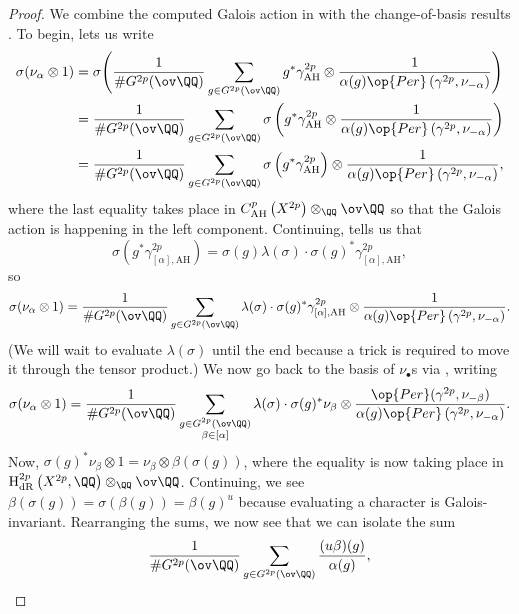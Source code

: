 \documentclass[../thesis.tex]{subfiles}
\begin{document}
\begin{proof}
	We combine the computed Galois action in  with the change-of-basis results . To begin,  lets us write
	\begin{align*}
		\sigma(\nu_\alpha\otimes1) &= \sigma\Bigg(\frac1{\#G^{2p}(\ov\QQ)}\sum_{g\in G^{2p}(\ov\QQ)}g^*\gamma^{2p}_{\mathrm{AH}}\otimes\frac1{\alpha(g)\op{Per}\left(\gamma^{2p},\nu_{-\alpha}\right)}\Bigg) \\
		&= \frac1{\#G^{2p}(\ov\QQ)}\sum_{g\in G^{2p}(\ov\QQ)}\sigma\left(g^*\gamma^{2p}_{\mathrm{AH}}\otimes\frac1{\alpha(g)\op{Per}\left(\gamma^{2p},\nu_{-\alpha}\right)}\right) \\
		&= \frac1{\#G^{2p}(\ov\QQ)}\sum_{g\in G^{2p}(\ov\QQ)}\sigma\left(g^*\gamma^{2p}_{\mathrm{AH}}\right)\otimes\frac1{\alpha(g)\op{Per}\left(\gamma^{2p},\nu_{-\alpha}\right)},
	\end{align*}
	where the last equality takes place in $C^p_{\mathrm{AH}}\left(X^{2p}\right)\otimes_\QQ\ov\QQ$ so that the Galois action is happening in the left component. Continuing,  tells us that
	\[\sigma\left(g^*\gamma_{[\alpha],\mathrm{AH}}^{2p}\right)=\sigma(g)\lambda(\sigma)\cdot\sigma(g)^*\gamma_{[\alpha],\mathrm{AH}}^{2p},\]
	so
	\[\sigma(\nu_\alpha\otimes1)=\frac1{\#G^{2p}(\ov\QQ)}\sum_{g\in G^{2p}(\ov\QQ)}\lambda(\sigma)\cdot\sigma(g)^*\gamma_{[\alpha],\mathrm{AH}}^{2p}\otimes\frac1{\alpha(g)\op{Per}\left(\gamma^{2p},\nu_{-\alpha}\right)}.\]
	(We will wait to evaluate $\lambda(\sigma)$ until the end because a trick is required to move it through the tensor product.) We now go back to the basis of $\nu_\bullet$s via , writing
	\[\sigma(\nu_\alpha\otimes1)=\frac1{\#G^{2p}(\ov\QQ)}\sum_{\substack{g\in G^{2p}(\ov\QQ)\\\beta\in[\alpha]}}\lambda(\sigma)\cdot\sigma(g)^*\nu_\beta\otimes\frac{\op{Per}(\gamma^{2p},\nu_{-\beta})}{\alpha(g)\op{Per}\left(\gamma^{2p},\nu_{-\alpha}\right)}.\]
	Now, $\sigma(g)^*\nu_\beta\otimes1=\nu_\beta\otimes\beta(\sigma(g))$, where the equality is now taking place in $\mathrm H^{2p}_{\mathrm{dR}}\left(X^{2p},\QQ\right)\otimes_\QQ\ov\QQ$. Continuing, we see $\beta(\sigma(g))=\sigma(\beta(g))=\beta(g)^u$ because evaluating a character is Galois-invariant. Rearranging the sums, we now see that we can isolate the sum
	\[\frac1{\#G^{2p}(\ov\QQ)}\sum_{g\in G^{2p}(\ov\QQ)}\frac{(u\beta)(g)}{\alpha(g)},\]

\end{proof}
\end{document}
